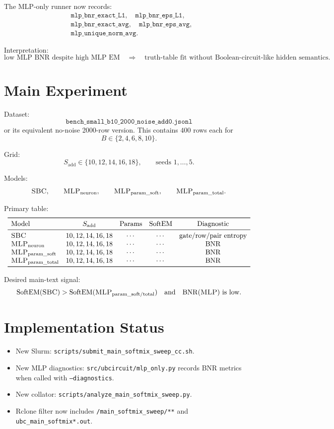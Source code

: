 \documentclass[11pt]{article}
\newcommand{\SBC}{\textsc{SBC}}
\newcommand{\MLP}{\textsc{MLP}}
\newcommand{\SoftEM}{\mathrm{SoftEM}}
\newcommand{\BNR}{\mathrm{BNR}}
\newcommand{\Sadd}{S_{\mathrm{add}}}
\begin{document}
The MLP-only runner now records:
\[
\begin{aligned}
  &\texttt{mlp\_bnr\_exact\_L1},\quad
   \texttt{mlp\_bnr\_eps\_L1},\\
  &\texttt{mlp\_bnr\_exact\_avg},\quad
   \texttt{mlp\_bnr\_eps\_avg},\\
  &\texttt{mlp\_unique\_norm\_avg}.
\end{aligned}
\]

Interpretation:
\[
  \text{low MLP BNR despite high MLP EM}
  \quad\Rightarrow\quad
  \text{truth-table fit without Boolean-circuit-like hidden semantics}.
\]

\section{Main Experiment}

Dataset:
\[
  \texttt{bench\_small\_b10\_2000\_noise\_add0.jsonl}
\]
or its equivalent no-noise 2000-row version.  This contains \(400\) rows each for
\[
  B \in \{2,4,6,8,10\}.
\]

Grid:
\[
  \Sadd \in \{10,12,14,16,18\},
  \qquad
  \text{seeds } 1,\dots,5.
\]

Models:
\[
  \SBC,
  \qquad
  \MLP_{\mathrm{neuron}},
  \qquad
  \MLP_{\mathrm{param\_soft}},
  \qquad
  \MLP_{\mathrm{param\_total}}.
\]

Primary table:
\[
\begin{array}{lcccc}
\toprule
\text{Model} & \Sadd & \text{Params} & \SoftEM & \text{Diagnostic} \\
\midrule
\SBC & 10,12,14,16,18 & \cdots & \cdots & \text{gate/row/pair entropy} \\
\MLP_{\mathrm{neuron}} & 10,12,14,16,18 & \cdots & \cdots & \BNR \\
\MLP_{\mathrm{param\_soft}} & 10,12,14,16,18 & \cdots & \cdots & \BNR \\
\MLP_{\mathrm{param\_total}} & 10,12,14,16,18 & \cdots & \cdots & \BNR \\
\bottomrule
\end{array}
\]

Desired main-text signal:
\[
  \SoftEM(\SBC) > \SoftEM(\MLP_{\mathrm{param\_soft/total}})
  \quad\text{and}\quad
  \BNR(\MLP)\ \text{is low}.
\]

\section{Implementation Status}

\begin{itemize}[leftmargin=1.5em]
  \item New Slurm: \texttt{scripts/submit\_main\_softmix\_sweep\_cc.sh}.
  \item New MLP diagnostics: \texttt{src/ubcircuit/mlp\_only.py} records BNR metrics when called with \texttt{--diagnostics}.
  \item New collator: \texttt{scripts/analyze\_main\_softmix\_sweep.py}.
  \item Rclone filter now includes \texttt{/main\_softmix\_sweep/**} and \texttt{ubc\_main\_softmix*.out}.
\end{itemize}
\end{document}
